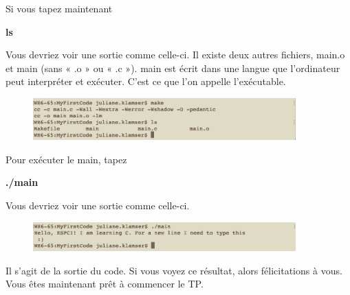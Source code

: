 \documentclass{article}
\begin{document}
Si vous tapez maintenant 
\begin{tcolorbox}[width=\textwidth,colframe=Bittersweet,colback={black},title={Ceci est le terminal},outer arc=0mm,colupper=white]   
      \large\textbf{ ls}
\end{tcolorbox}
Vous devriez voir une sortie comme celle-ci. Il existe deux autres fichiers, main.o et main (sans « .o » ou « .c »). main est écrit dans une langue que l'ordinateur peut interpréter et exécuter. C'est ce que l'on appelle l'exécutable.
 \begin{figure}[H]
\center
\includegraphics[width=0.9\textwidth]{Plots/FirstCode_7.png}
\end{figure}
Pour exécuter le main, tapez
\begin{tcolorbox}[width=\textwidth,colframe=Bittersweet,colback={black},title={Ceci est le terminal},outer arc=0mm,colupper=white]   
      \large\textbf{ ./main}
\end{tcolorbox}
Vous devriez voir une sortie comme celle-ci. 
\begin{figure}[H]
\center
\includegraphics[width=0.9\textwidth]{Plots/FirstCode_8.png}
\end{figure}
Il s'agit de la sortie du code. Si vous voyez ce résultat, alors félicitations à vous. Vous êtes maintenant prêt à commencer le TP.

%  
\end{document}
